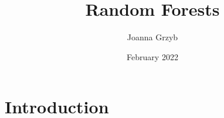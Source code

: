 \documentclass{llncs}
\title{Random Forests}
\author{Joanna Grzyb}
\date{February 2022}
\begin{document}
\maketitle

\section{Introduction}
















\end{document}
